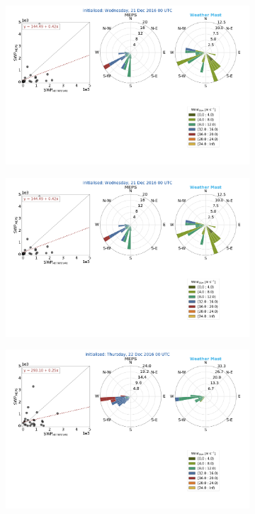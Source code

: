 \begin{figure}[h]
	\centering
	\begin{subfigure}[b]{0.84\textwidth}
		\includegraphics[trim={2.3cm 19.5cm 2.cm .7cm},clip,width=\textwidth]{./fig_windrose/20161221}
		\caption{}\label{fig:wind21}
	\end{subfigure}
	\begin{subfigure}[b]{0.15\textwidth}
		\includegraphics[trim={50.cm 0.cm 8.3cm 28.4cm},clip,width=\textwidth]{./fig_windrose/20161221}
	\end{subfigure}
	\newline
	\begin{subfigure}[b]{0.84\textwidth}
		\includegraphics[trim={2.3cm 19.5cm 2.cm .7cm},clip,width=\textwidth]{./fig_windrose/20161222}

\end{subfigure}
\end{figure}
